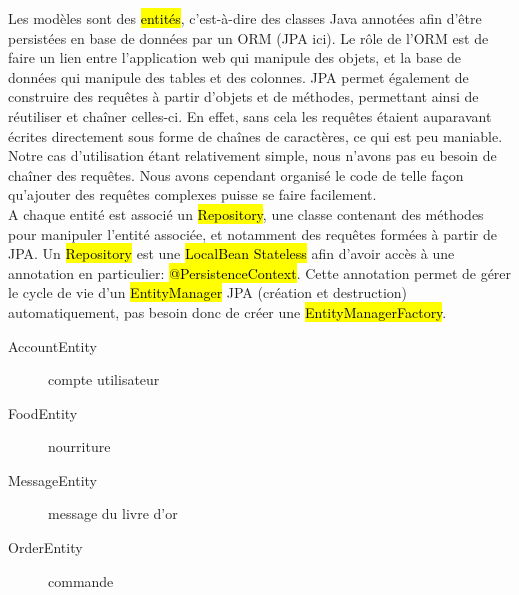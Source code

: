 Les modèles sont des \hl{entit\'es}, c'est-à-dire des classes Java annotées afin
d'être persistées en base de données par un ORM (JPA ici). Le rôle de l'ORM est
de faire un lien entre l'application web qui manipule des objets, et la base de
données qui manipule des tables et des colonnes. JPA permet également de
construire des requêtes à partir d'objets et de méthodes, permettant ainsi de
réutiliser et chaîner celles-ci. En effet, sans cela les requêtes étaient
auparavant écrites directement sous forme de chaînes de caractères, ce qui est
peu maniable.\\

Notre cas d'utilisation étant relativement simple, nous n'avons pas eu besoin
de chaîner des requêtes. Nous avons cependant organisé le code de telle façon
qu'ajouter des requêtes complexes puisse se faire facilement.\\

A chaque entité est associé un \hl{Repository}, une classe contenant des méthodes
pour manipuler l'entité associée, et notamment des requêtes formées à partir
de JPA. Un \hl{Repository} est une \hl{LocalBean Stateless} afin d'avoir
accès à une annotation en particulier: \hl{@PersistenceContext}. Cette
annotation permet de gérer le cycle de vie d'un \hl{EntityManager} JPA
(création et destruction) automatiquement, pas besoin donc de créer une
\hl{EntityManagerFactory}.\\

\begin{description}
    \item[AccountEntity] compte utilisateur
    \item[FoodEntity] nourriture
    \item[MessageEntity] message du livre d'or
    \item[OrderEntity] commande
\end{description}
